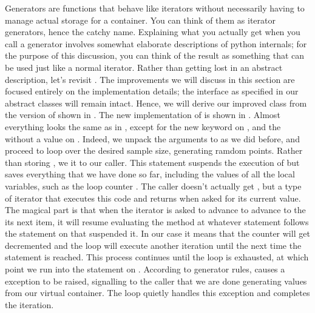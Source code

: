 Generators are functions that behave like iterators without necessarily having to manage actual
storage for a container. You can think of them as iterator generators, hence the catchy name.
Explaining what you actually get when you call a generator involves somewhat elaborate
descriptions of python internals; for the purpose of this discussion, you can think of the
result as something that can be used just like a normal iterator. Rather than getting lost in
an abstract description, let's revisit . The improvements we will
discuss in this section are focused entirely on the implementation details; the interface as
specified in our abstract classes will remain intact. Hence, we will derive our improved class
from the version of  shown in . The new
implementation of  is shown in .
%
%
Almost everything looks the same as in , except for the new
keyword  on , and the  without a
value on . Indeed, we unpack the arguments to 
as we did before, and proceed to loop over the desired sample size, generating ramdom points.
Rather than storing , we  it to our caller. This statement
suspends the execution of  but saves everything that we have done so far,
including the values of all the local variables, such as the loop counter . The
caller doesn't actually get , but a type of iterator that executes this code and
returns  when asked for its current value. The magical part is that when the
iterator is asked to advance to advance to the its next item, it will resume evaluating the
method  at whatever statement follows the  statement on
 that suspended it. In our case it means that the counter will
get decremented and the loop will execute another iteration until the next time the
 statement is reached. This process continues until the loop is exhausted, at
which point we run into the  statement on
. According to generator rules,  causes a
 exception to be raised, signalling to the caller that we are done
generating values from our virtual container. The  loop quietly handles this
exception and completes the iteration.

